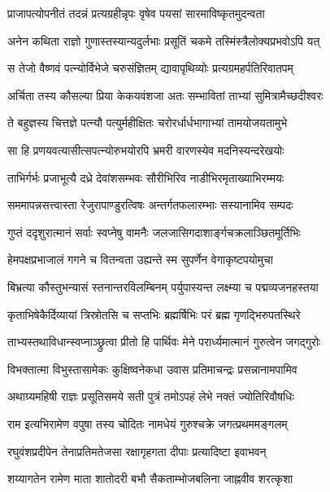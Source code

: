 \twolineshloka
{प्राजापत्योपनीतं तदन्नं प्रत्यग्रहीन्नृपः}
{वृषेव पयसां सारमाविष्कृतमुदन्वता} %

\twolineshloka
{अनेन कथिता राज्ञो गुणास्तस्यान्यदुर्लभाः}
{प्रसूतिं चकमे तस्मिंस्त्रैलोक्यप्रभवोऽपि यत्} %

\twolineshloka
{स तेजो वैष्णवं पत्न्योर्विभेजे चरुसंज्ञितम्}
{द्यावापृथिव्योः प्रत्यग्रमहर्पतिरिवातपम्} %

\twolineshloka
{अर्चिता तस्य कौसल्या प्रिया केकयवंशजा}
{अतः सम्भावितां ताभ्यां सुमित्रामैच्छदीश्वरः} %

\twolineshloka
{ते बहुज्ञस्य चित्तज्ञे पत्न्यौ पत्युर्महीक्षितः}
{चरोरर्धार्धभागाभ्यां तामयोजयतामुभे} %

\twolineshloka
{सा हि प्रणयवत्यासीत्सपत्न्योरुभयोरपि}
{भ्रमरी वारणस्येव मदनिस्यन्दरेखयोः} %

\twolineshloka
{ताभिर्गर्भः प्रजाभूत्यै दध्रे देवांशसम्भवः}
{सौरीभिरिव नाडीभिरमृताख्याभिरम्मयः} %

\twolineshloka
{सममापन्नसत्त्वास्ता रेजुरापाण्डुरत्विषः}
{अन्तर्गतफलारम्भाः सस्यानामिव सम्पदः} %

\twolineshloka
{गुप्तं ददृशुरात्मानं सर्वाः स्वप्नेषु वामनैः}
{जलजासिगदाशार्ङ्गचक्रलाञ्छितमूर्तिभिः} %

\twolineshloka
{हेमपक्षप्रभाजालं गगने च वितन्वता}
{उह्यन्ते स्म सुपर्णेन वेगाकृष्टपयोमुचा} %

\twolineshloka
{बिभ्रत्या कौस्तुभन्यासं स्तनान्तरविलम्बिनम्}
{पर्युपास्यन्त लक्ष्म्या च पद्मव्यजनहस्तया} %

\twolineshloka
{कृताभिषेकैर्दिव्यायां त्रिस्रोतसि च सप्तभिः}
{ब्रह्मर्षिभिः परं ब्रह्म गृणद्भिरुपतस्थिरे} %

\twolineshloka
{ताभ्यस्तथाविधान्स्वप्नाञ्छ्रुत्वा प्रीतो हि पार्थिवः}
{मेने परार्ध्यमात्मानं गुरुत्वेन जगद्गुरोः} %

\twolineshloka
{विभक्तात्मा विभुस्तासामेकः कुक्षिष्वनेकधा}
{उवास प्रतिमाचन्द्रः प्रसन्नानामपामिव} %

\twolineshloka
{अथाग्र्यमहिषी राज्ञः प्रसूतिसमये सती}
{पुत्रं तमोऽपहं लेभे नक्तं ज्योतिरिवौषधिः} %

\twolineshloka
{राम इत्यभिरामेण वपुषा तस्य चोदितः}
{नामधेयं गुरुश्चक्रे जगत्प्रथममङ्गलम्} %

\twolineshloka
{रघुवंशप्रदीपेन तेनाप्रतिमतेजसा}
{रक्षागृहगता दीपाः प्रत्यादिष्टा इवाभवन्} %

\twolineshloka
{शय्यागतेन रामेण माता शातोदरी बभौ}
{सैकताम्भोजबलिना जाह्नवीव शरत्कृशा} %


